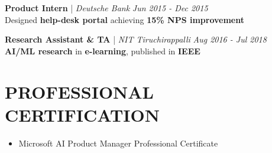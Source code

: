\documentclass[10pt,a4paper]{article}
\begin{document}
\textbf{Product Intern} | \textit{Deutsche Bank} \hfill \textit{Jun 2015 - Dec 2015} \\
Designed \textbf{help-desk portal} achieving \textbf{15\% NPS improvement}

\vspace{4pt}

\textbf{Research Assistant \& TA} | \textit{NIT Tiruchirappalli} \hfill \textit{Aug 2016 - Jul 2018} \\
\textbf{AI/ML research} in \textbf{e-learning}, published in \textbf{IEEE}

\section{PROFESSIONAL CERTIFICATION}

\begin{itemize}[leftmargin=*]
    \item Microsoft AI Product Manager Professional Certificate 
\end{itemize}
\end{document}
